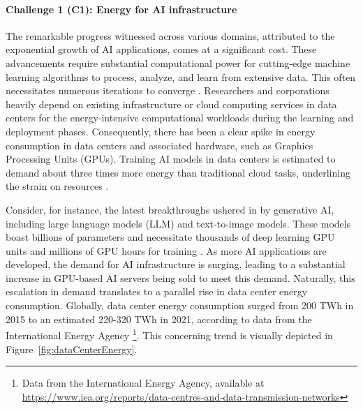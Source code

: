 \documentclass[12pt]{article}
\begin{document}
\paragraph*{\textbf{Challenge 1} (C1): Energy for AI infrastructure}
The remarkable progress witnessed across various domains, attributed to the exponential growth of AI applications, comes at a significant cost. These advancements require substantial computational power for cutting-edge machine learning algorithms to process, analyze, and learn from extensive data. This often necessitates numerous iterations to converge \cite{Strubell2019EnergyPolicyConsiderations}. Researchers and corporations heavily depend on existing infrastructure or cloud computing services in data centers for the energy-intensive computational workloads during the learning and deployment phases. Consequently, there has been a clear spike in energy consumption in data centers and associated hardware, such as Graphics Processing Units (GPUs). Training AI models in data centers is estimated to demand about three times more energy than traditional cloud tasks, underlining the strain on resources \cite{Thomas2023cloudusesmassive}.

Consider, for instance, the latest breakthroughs ushered in by generative AI, including large language models (LLM) and text-to-image models. These models boast billions of parameters and necessitate thousands of deep learning GPU units and millions of GPU hours for training \cite{Vanian2023ChatGPTgenerativeAI, Corbyn2023Nvidiachipmaker}. As more AI applications are developed, the demand for AI infrastructure is surging, leading to a substantial increase in GPU-based AI servers being sold to meet this demand. Naturally, this escalation in demand translates to a parallel rise in data center energy consumption. Globally, data center energy consumption surged from 200 TWh in 2015 to an estimated 220-320 TWh in 2021, according to data from the International Energy Agency \footnote{Data from the International Energy Agency, available at \url{https://www.iea.org/reports/data-centres-and-data-transmission-networks}}. This concerning trend is visually depicted in Figure~\ref{fig:dataCenterEnergy}.
\end{document}
